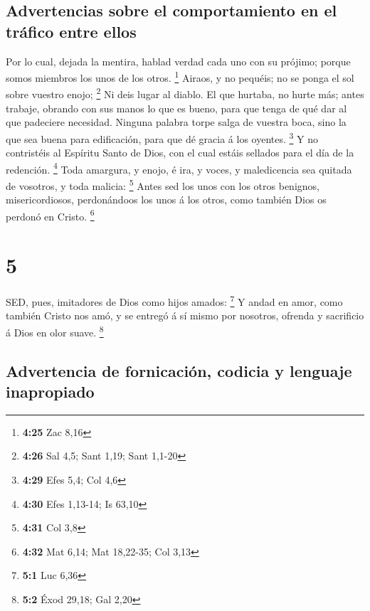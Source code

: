 \hypertarget{advertencias-sobre-el-comportamiento-en-el-truxe1fico-entre-ellos}{%
\subsection{Advertencias sobre el comportamiento en el tráfico entre
ellos}\label{advertencias-sobre-el-comportamiento-en-el-truxe1fico-entre-ellos}}

 Por lo cual, dejada la mentira, hablad verdad cada uno con
su prójimo; porque somos miembros los unos de los otros. \footnote{\textbf{4:25}
  Zac 8,16}  Airaos, y no pequéis; no se ponga el sol sobre
vuestro enojo; \footnote{\textbf{4:26} Sal 4,5; Sant 1,19; Sant 1,1-20}
 Ni deis lugar al diablo.  El que hurtaba, no
hurte más; antes trabaje, obrando con sus manos lo que es bueno, para
que tenga de qué dar al que padeciere necesidad.  Ninguna
palabra torpe salga de vuestra boca, sino la que sea buena para
edificación, para que dé gracia á los oyentes. \footnote{\textbf{4:29}
  Efes 5,4; Col 4,6}  Y no contristéis al Espíritu Santo de
Dios, con el cual estáis sellados para el día de la redención.
\footnote{\textbf{4:30} Efes 1,13-14; Is 63,10}  Toda
amargura, y enojo, é ira, y voces, y maledicencia sea quitada de
vosotros, y toda malicia: \footnote{\textbf{4:31} Col 3,8} 
Antes sed los unos con los otros benignos, misericordiosos, perdonándoos
los unos á los otros, como también Dios os perdonó en Cristo.
\footnote{\textbf{4:32} Mat 6,14; Mat 18,22-35; Col 3,13}

\hypertarget{section-4}{%
\section{5}\label{section-4}}

 SED, pues, imitadores de Dios como hijos amados:
\footnote{\textbf{5:1} Luc 6,36}  Y andad en amor, como
también Cristo nos amó, y se entregó á sí mismo por nosotros, ofrenda y
sacrificio á Dios en olor suave. \footnote{\textbf{5:2} Éxod 29,18; Gal
  2,20}

\hypertarget{advertencia-de-fornicaciuxf3n-codicia-y-lenguaje-inapropiado}{%
\subsection{Advertencia de fornicación, codicia y lenguaje
inapropiado}\label{advertencia-de-fornicaciuxf3n-codicia-y-lenguaje-inapropiado}}


